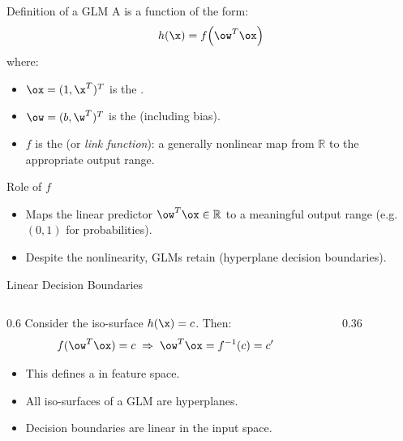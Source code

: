 \begin{frame}{Definition of a GLM}
  A  is a function of the form:
  \[
    h(\x) = f\!\left(\ow^T\ox\right)
  \]
  where:
  \begin{itemize}
    \item $\ox = (1, \x^T)^T$ is the .
    \item $\ow = (b, \w^T)^T$ is the  (including bias).
    \item $f$ is the  (or \emph{link function}): a generally nonlinear map from $\mathbb{R}$ to the appropriate output range.
  \end{itemize}
  \vspace{0.3cm}
  \begin{block}{Role of $f$}
    \begin{itemize}
      \item Maps the linear predictor $\ow^T\ox \in \mathbb{R}$ to a meaningful output range (e.g.\ $(0,1)$ for probabilities).
      \item Despite the nonlinearity, GLMs retain  (hyperplane decision boundaries).
    \end{itemize}
  \end{block}
\end{frame}

\begin{frame}{Linear Decision Boundaries}
  \begin{columns}[T]
    \begin{column}{0.6\textwidth}
      Consider the iso-surface $h(\x) = c$. Then:
      \[
        f(\ow^T\ox) = c \;\Rightarrow\; \ow^T\ox = f^{-1}(c) = c'
      \]
      \begin{itemize}
        \item This defines a  in feature space.
        \item All iso-surfaces of a GLM are hyperplanes.
        \item Decision boundaries are linear in the input space.
      \end{itemize}
    \end{column}
    \begin{column}{0.36\textwidth}
    \end{column}
  \end{columns}
\end{frame}

